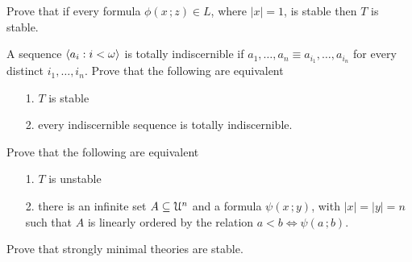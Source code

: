 \begin{exercise}
  Prove that if every formula $\phi(x\,;z)\in L$, where $|x|=1$, is stable then $T$ is stable.
\end{exercise}

\begin{exercise} 
  A sequence $\langle a_i:i<\omega\rangle$ is totally indiscernible if $a_1,\dots,a_n\equiv a_{i_1},\dots,a_{i_n}$ for every distinct $i_1,\dots,i_n$.
  Prove that the following are equivalent
  \begin{itemize}
  \item[1.] $T$ is stable
  \item[2.] every indiscernible sequence is totally indiscernible.
  \end{itemize}
\end{exercise}

\begin{exercise}\label{ex_stable_orderproperty}
Prove that the following are equivalent
\begin{itemize}
\item[1.] $T$ is unstable
\item[2.] there is an infinite set $A\subseteq\EuScript U^n$ and a formula  $\psi(x\,;y)$, with $|x|=|y|=n$ such that $A$ is linearly ordered by the relation $a<b\iff\psi(a\,;b)$.
\end{itemize}
\end{exercise}

\begin{exercise}
Prove that strongly minimal theories are stable.
\end{exercise}




